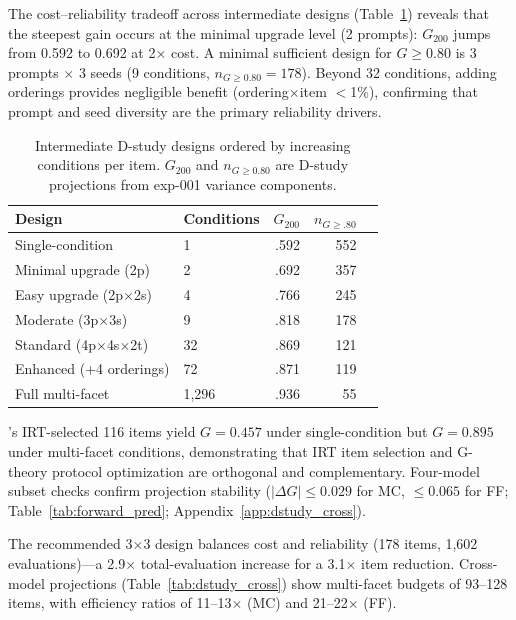 The cost--reliability tradeoff across intermediate designs (Table~\ref{tab:intermediate_dstudy}) reveals that the steepest gain occurs at the minimal upgrade level (2 prompts): $G_{200}$ jumps from 0.592 to 0.692 at 2$\times$ cost. A minimal sufficient design for $G \geq 0.80$ is 3 prompts $\times$ 3 seeds (9 conditions, $n_{G \geq 0.80} = 178$). Beyond 32 conditions, adding orderings provides negligible benefit (ordering$\times$item $<$1\%), confirming that prompt and seed diversity are the primary reliability drivers.

\begin{table}[t]
\centering
\caption{Intermediate D-study designs ordered by increasing conditions per item. $G_{200}$ and $n_{G \geq 0.80}$ are D-study projections from exp-001 variance components.}
\label{tab:intermediate_dstudy}
\scriptsize
\begin{tabular}{llrrr}
\toprule
Design & Conditions & $G_{200}$ & $n_{G{\geq}.80}$ \\
\midrule
Single-condition & 1 & .592 & 552 \\
Minimal upgrade (2p) & 2 & .692 & 357 \\
Easy upgrade (2p$\times$2s) & 4 & .766 & 245 \\
Moderate (3p$\times$3s) & 9 & .818 & 178 \\
Standard (4p$\times$4s$\times$2t) & 32 & .869 & 121 \\
Enhanced (+4 orderings) & 72 & .871 & 119 \\
Full multi-facet & 1{,}296 & .936 & 55 \\
\bottomrule
\end{tabular}
\end{table}

\citet{zhou2026irt}'s IRT-selected 116 items yield $G = 0.457$ under single-condition but $G = 0.895$ under multi-facet conditions, demonstrating that IRT item selection and G-theory protocol optimization are orthogonal and complementary. Four-model subset checks confirm projection stability ($|\Delta G| \leq 0.029$ for MC, $\leq 0.065$ for FF; Table~\ref{tab:forward_pred}; Appendix~\ref{app:dstudy_cross}).

The recommended 3$\times$3 design balances cost and reliability (178 items, 1,602 evaluations)---a 2.9$\times$ total-evaluation increase for a 3.1$\times$ item reduction. Cross-model projections (Table~\ref{tab:dstudy_cross}) show multi-facet budgets of 93--128 items, with efficiency ratios of 11--13$\times$ (MC) and 21--22$\times$ (FF).

